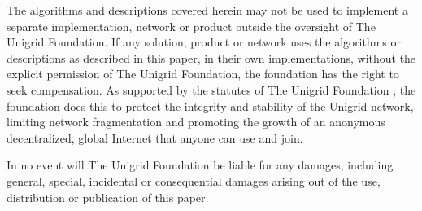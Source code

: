 \documentclass[10pt,a4paper,final]{article}
\begin{document}
The algorithms and descriptions covered herein may not be used to implement a separate implementation, network or product outside the oversight of The Unigrid Foundation. If any solution, product or network uses the algorithms or descriptions as described in this paper, in their own implementations, without the explicit permission of The Unigrid Foundation, the foundation has the right to seek compensation. As supported by the statutes of The Unigrid Foundation \cite{unigridstatutes}, the foundation does this to protect the integrity and stability of the Unigrid network, limiting network fragmentation and promoting the growth of an anonymous decentralized, global Internet that anyone can use and join.

In no event will The Unigrid Foundation be liable for any damages, including general, special, incidental or consequential damages arising out of the use, distribution or publication of this paper.

\clearpage
\end{document}

